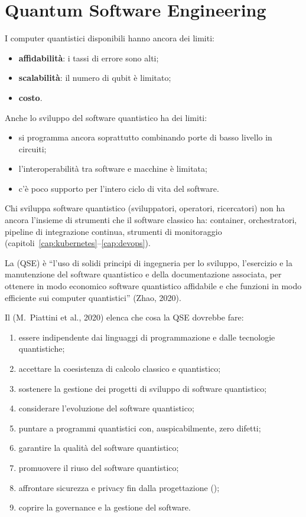 \section{Quantum Software Engineering}
\label{sec:qse-qse}

I computer quantistici disponibili hanno ancora dei limiti:
\begin{itemize}
  \item \textbf{affidabilità}: i tassi di errore sono alti;
  \item \textbf{scalabilità}: il numero di qubit è limitato;
  \item \textbf{costo}.
\end{itemize}
Anche lo sviluppo del software quantistico ha dei limiti:
\begin{itemize}
  \item si programma ancora soprattutto combinando porte di basso livello in circuiti;
  \item l'interoperabilità tra software e macchine è limitata;
  \item c'è poco supporto per l'intero ciclo di vita del software.
\end{itemize}
Chi sviluppa software quantistico (sviluppatori, operatori, ricercatori) non ha ancora l'insieme di strumenti che il
software classico ha: container, orchestratori, pipeline di integrazione continua, strumenti di monitoraggio
(capitoli~\ref{cap:kubernetes}--\ref{cap:devops}).

\begin{definizione}
La  (QSE) è ``l'uso di solidi principi di ingegneria per lo sviluppo, l'esercizio
e la manutenzione del software quantistico e della documentazione associata, per ottenere in modo economico software
quantistico affidabile e che funzioni in modo efficiente sui computer quantistici'' (Zhao, 2020).
\end{definizione}

Il  (M.~Piattini et al., 2020) elenca che cosa la QSE dovrebbe fare:
\begin{enumerate}
  \item essere indipendente dai linguaggi di programmazione e dalle tecnologie quantistiche;
  \item accettare la coesistenza di calcolo classico e quantistico;
  \item sostenere la gestione dei progetti di sviluppo di software quantistico;
  \item considerare l'evoluzione del software quantistico;
  \item puntare a programmi quantistici con, auspicabilmente, zero difetti;
  \item garantire la qualità del software quantistico;
  \item promuovere il riuso del software quantistico;
  \item affrontare sicurezza e privacy fin dalla progettazione ();
  \item coprire la governance e la gestione del software.
\end{enumerate}

